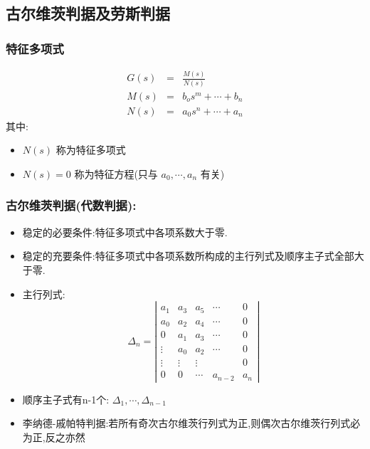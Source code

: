 \documentclass{article}
\begin{document}
\subsection{古尔维茨判据及劳斯判据}
\label{sec-2-2}
\begin{frame}
\frametitle{特征多项式}
\label{sec-2-2-1}

\begin{eqnarray*}
G(s) & = & \frac{M(s)}{N(s)}\\
M(s) &=&  b_{o}s^{m}+\cdots+b_{n} \\
N(s) & =& a_{0}s^{n}+\cdots+a_{n}
\end{eqnarray*}
其中:
\begin{itemize}
\item $N(s)$ 称为特征多项式
\item $N(s)=0$ 称为特征方程(只与 $a_{0},\cdots,a_{n}$ 有关)
\end{itemize}
\end{frame}
\begin{frame}
\frametitle{古尔维茨判据(代数判据):}
\label{sec-2-2-2}

\begin{itemize}
\item <2-> 稳定的必要条件:特征多项式中各项系数大于零.
\item <3-> 稳定的充要条件:特征多项式中各项系数所构成的主行列式及顺序主子式全部大于零.
\item <3-> 主行列式:
      \begin{equation*}
      \Delta_{n}=\left|
      \begin{matrix}
      a_{1}  & a_{3} & a_{5} & \cdots & 0  \\
      a_{0}  & a_{2} & a_{4} & \cdots & 0  \\
      0      & a_{1} & a_{3} & \cdots & 0  \\
      \vdots & a_{0} & a_{2} & \cdots & 0  \\
      \vdots &\vdots &\vdots &        & 0   \\
       	0    &  0    & \cdots & a_{n-2}& a_{n}
      \end{matrix}
      \right|
      \end{equation*}
\item <4-> 顺序主子式有n-1个: $\Delta_{1},\cdots,\Delta_{n-1}$
\item <5-> 李纳德-戚帕特判据:若所有奇次古尔维茨行列式为正,则偶次古尔维茨行列式必为正,反之亦然
\end{itemize}
\end{frame}
\end{document}
